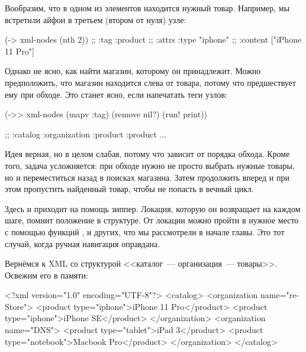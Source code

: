 Вообразим, что в одном из элементов находится нужный товар. Например, мы
встретили айфон в третьем (втором от нуля) узле:

\begin{english}
  \begin{clojure}
(-> xml-nodes (nth 2))
;; {:tag :product
;;  :attrs {:type "iphone"}
;;  :content ["iPhone 11 Pro"]}
  \end{clojure}
\end{english}

Однако не ясно, как найти магазин, которому он принадлежит. Можно предположить,
что магазин находится слева от товара, потому что предшествует ему при
обходе. Это станет ясно, если напечатать теги узлов:

\begin{english}
  \begin{clojure}
(->> xml-nodes
     (mapv :tag)
     (remove nil?)
     (run! print))

;; :catalog :organization :product :product ...
  \end{clojure}
\end{english}

Идея верная, но в целом слабая, потому что зависит от порядка обхода. Кроме
того, задача усложняется: при обходе нужно не просто выбрать нужные товары, но и
переместиться назад в поисках магазина. Затем продолжить вперед и при этом
пропустить найденный товар, чтобы не попасть в вечный цикл.

Здесь и приходит на помощь зиппер. Локация, которую он возвращает на каждом
шаге, помнит положение в структуре. От локации можно пройти в нужное место с
помощью функций ,  и других, что мы рассмотрели в
начале главы. Это тот случай, когда ручная навигация оправдана.


Вернёмся к XML со структурой <<каталог~--- организация~--- товары>>. Освежим его в
памяти:

\begin{english}
  \begin{xml}
<?xml version="1.0" encoding="UTF-8"?>
<catalog>
  <organization name="re-Store">
    <product type="iphone">iPhone 11 Pro</product>
    <product type="iphone">iPhone SE</product>
  </organization>
  <organization name="DNS">
    <product type="tablet">iPad 3</product>
    <product type="notebook">Macbook Pro</product>
  </organization>
</catalog>
  \end{xml}
\end{english}

